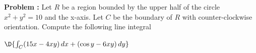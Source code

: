 {\bf Problem :} Let $R$ be a region bounded by the upper half of the circle $x^2+y^2=10$ and the x-axis.  Let $C$ be the boundary of $R$ with counter-clockwise orientation.  Compute the following line integral 
\begin{center}
	$\D{\int_{C} (15x-4xy) \, dx + (\cos y-6xy) \, dy}$ 
\end{center}
